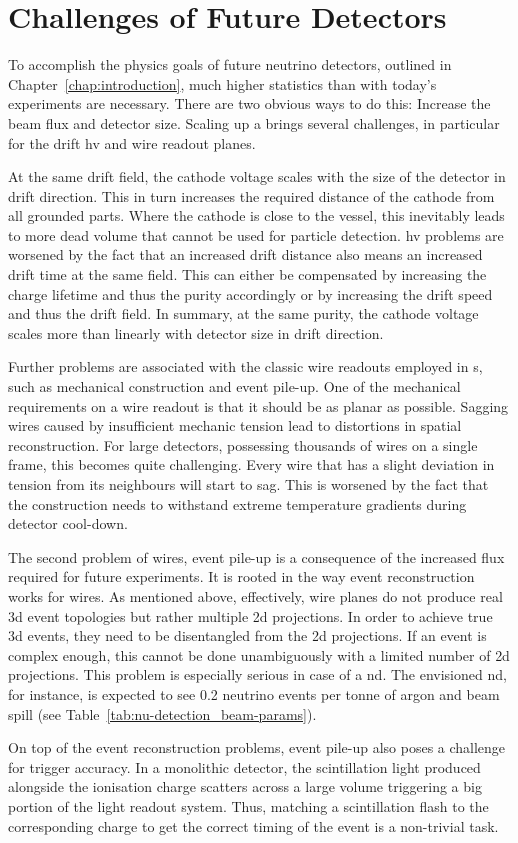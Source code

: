 \section{Challenges of Future Detectors}
\label{sec:lartpc_challenges}

To accomplish the physics goals of future neutrino detectors, outlined in Chapter~\ref{chap:introduction}, much higher statistics than with today's experiments are necessary.
There are two obvious ways to do this: Increase the beam flux and detector size.
Scaling up a \lartpc{} brings several challenges, in particular for the drift \gls{hv} and wire readout planes.

At the same drift field, the cathode voltage scales with the size of the detector in drift direction.
This in turn increases the required distance of the cathode from all grounded parts.
Where the cathode is close to the \lar{} vessel, this inevitably leads to more dead volume that cannot be used for particle detection.
\gls{hv} problems are worsened by the fact that an increased drift distance also means an increased drift time at the same field.
This can either be compensated by increasing the charge lifetime and thus the \lar{} purity accordingly or by increasing the drift speed and thus the drift field.
In summary, at the same \lar{} purity, the cathode voltage scales more than linearly with detector size in drift direction.

Further problems are associated with the classic wire readouts employed in \lartpc{}s, such as mechanical construction and event pile-up.
One of the mechanical requirements on a wire readout is that it should be as planar as possible.
Sagging wires caused by insufficient mechanic tension lead to distortions in spatial reconstruction.
For large detectors, possessing thousands of wires on a single frame, this becomes quite challenging.
Every wire that has a slight deviation in tension from its neighbours will start to sag.
This is worsened by the fact that the construction needs to withstand extreme temperature gradients during detector cool-down.

The second problem of wires, event pile-up is a consequence of the increased flux required for future experiments.
It is rooted in the way event reconstruction works for wires.
As mentioned above, effectively, wire planes do not produce real \gls{3d} event topologies but rather multiple \gls{2d} projections.
In order to achieve true \gls{3d} events, they need to be disentangled from the \gls{2d} projections.
If an event is complex enough, this cannot be done unambiguously with a limited number of \gls{2d} projections.
This problem is especially serious in case of a \gls{nd}.
The envisioned \dune{} \gls{nd}, for instance, is expected to see \num{0.2} neutrino events per tonne of argon and beam spill (see Table~\ref{tab:nu-detection_beam-params}).

On top of the event reconstruction problems, event pile-up also poses a challenge for trigger accuracy.
In a monolithic detector, the scintillation light produced alongside the ionisation charge scatters across a large volume triggering a big portion of the light readout system.
Thus, matching a scintillation flash to the corresponding charge to get the correct timing of the event is a non-trivial task.
